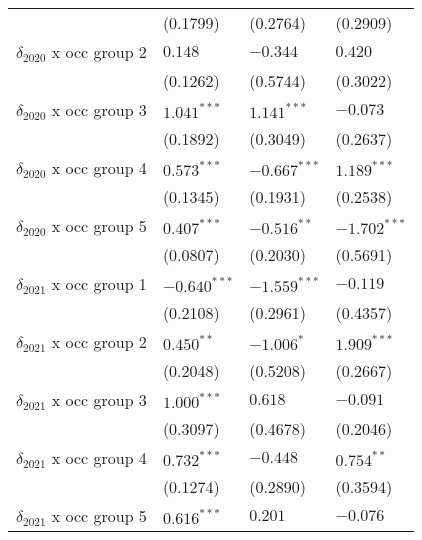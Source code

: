 \begin{tabular}{llll}
                                       &           (0.1799) &           (0.2764) &           (0.2909) \\
$\delta_{2020}$ x occ group 2          &            $0.148$ &           $-0.344$ &            $0.420$ \\
                                       &           (0.1262) &           (0.5744) &           (0.3022) \\
$\delta_{2020}$ x occ group 3          &      $1.041^{***}$ &      $1.141^{***}$ &           $-0.073$ \\
                                       &           (0.1892) &           (0.3049) &           (0.2637) \\
$\delta_{2020}$ x occ group 4          &      $0.573^{***}$ &     $-0.667^{***}$ &      $1.189^{***}$ \\
                                       &           (0.1345) &           (0.1931) &           (0.2538) \\
$\delta_{2020}$ x occ group 5          &      $0.407^{***}$ &      $-0.516^{**}$ &     $-1.702^{***}$ \\
                                       &           (0.0807) &           (0.2030) &           (0.5691) \\
$\delta_{2021}$ x occ group 1          &     $-0.640^{***}$ &     $-1.559^{***}$ &           $-0.119$ \\
                                       &           (0.2108) &           (0.2961) &           (0.4357) \\
$\delta_{2021}$ x occ group 2          &       $0.450^{**}$ &         $-1.006^*$ &      $1.909^{***}$ \\
                                       &           (0.2048) &           (0.5208) &           (0.2667) \\
$\delta_{2021}$ x occ group 3          &      $1.000^{***}$ &            $0.618$ &           $-0.091$ \\
                                       &           (0.3097) &           (0.4678) &           (0.2046) \\
$\delta_{2021}$ x occ group 4          &      $0.732^{***}$ &           $-0.448$ &       $0.754^{**}$ \\
                                       &           (0.1274) &           (0.2890) &           (0.3594) \\
$\delta_{2021}$ x occ group 5          &      $0.616^{***}$ &            $0.201$ &           $-0.076$ \\

\end{tabular}
